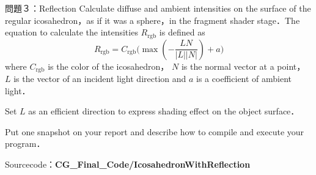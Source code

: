 \documentclass[a4paper,11pt]{jsarticle}
\numberwithin{theorem}{section}  %
\numberwithin{equation}{section} %
\begin{document}
\newpage

\begin{itembox}[l]{問題３：Reflection}
Calculate diffuse and ambient intensities on the surface of the regular icosahedron，as if it was a sphere，in the fragment shader stage．The equation to calculate the intensities $R_{\text{rgb}}$ is defined as
\[
R_{\text{rgb}} = C_{\text{rgb}}\Bigr( \max ( - \frac{LN}{|L||N|} ) + a \Bigr)
\]
where $C_{\text{rgb}}$ is the color of
the icosahedron， $N$ is the normal vector at a point， $L$ is the vector of an incident light direction and $a$ is a coefficient of
ambient light．

Set $L$ as an efficient direction to express shading effect on the object surface．



Put one snapshot on your report and describe how to compile and execute your program．
\end{itembox}

Sourcecode：{\bf CG\_Final\_Code/IcosahedronWithReflection}
\end{document}
